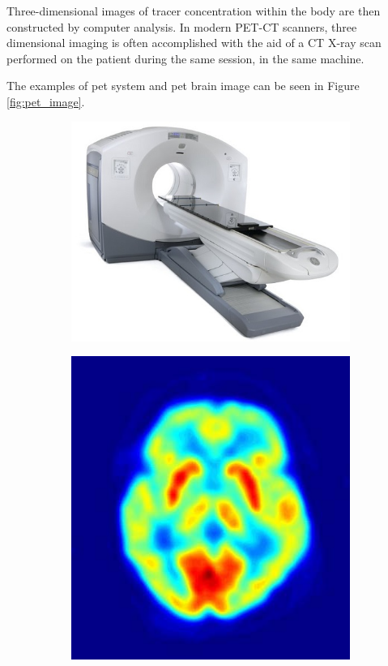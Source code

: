 Three-dimensional images of tracer concentration within the body are then constructed by computer analysis. In modern PET-CT scanners, three dimensional imaging is often accomplished with the aid of a CT X-ray scan performed on the patient during the same session, in the same machine.

The examples of \gls{pet} system and \gls{pet} brain image can be seen in Figure \ref{fig:pet_image}.

\begin{figure}[h]
	\centering
	\begin{subfigure}[b]{0.45\textwidth}
		\includegraphics[width=\textwidth]{fig/pet_machine.jpg}
		\label{fig:pet_machine}
	\end{subfigure}
	\begin{subfigure}[b]{0.35\textwidth}
		\includegraphics[width=\textwidth]{fig/pet_brain.jpg}

\end{subfigure}
\end{figure}

